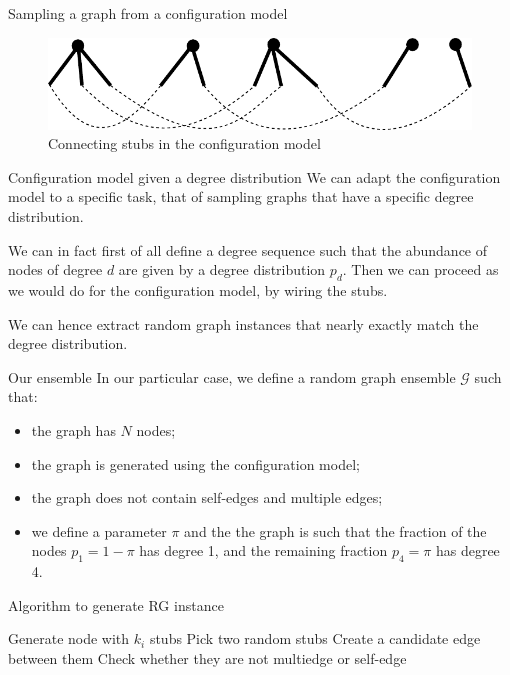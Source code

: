 \documentclass[handout]{beamer}
\begin{document}
\begin{frame}{Sampling a graph from a configuration model}
    \begin{figure}
        \centering
        \includegraphics[width=.4\textwidth]{config_model}
        \caption{Connecting stubs in the configuration model}
        \label{fig:config_model}
    \end{figure}
\end{frame}

\begin{frame}{Configuration model given a degree distribution}
    We can adapt the configuration model to a specific task, that of sampling
    graphs that have a specific \alert{degree distribution}.

    We can in fact first of all define a degree sequence such that the abundance
    of nodes of degree $d$ are given by a degree distribution $p_d$. Then we can
    proceed as we would do for the configuration model, by wiring the stubs.

    We can hence extract random graph instances that nearly exactly match the
    degree distribution.
\end{frame}

\begin{frame}{Our ensemble}
    In our particular case, we define a random graph ensemble $\mathcal{G}$ such
    that:
    \begin{itemize}
        \item the graph has $N$ nodes;
        \item the graph is generated using the configuration model;
        \item the graph \alert{does not} contain self-edges and multiple edges;
        \item we define a parameter $\pi$ and the the graph is such that the
            fraction of the nodes $p_1 = 1-\pi$ has degree 1, and the remaining
            fraction $p_4 = \pi$ has degree 4.
    \end{itemize}
\end{frame}

\begin{frame}{Algorithm to generate RG instance}
    \begin{algorithm}[H]
        \begin{algorithmic}[1]
                \STATE Generate node with $k_i$ stubs
            \ENDFOR
                    \STATE Pick two random stubs
                    \STATE Create a candidate edge between them
                    \STATE Check whether they are not multiedge or self-edge
                \ENDWHILE
            \ENDWHILE
        \end{algorithmic}
        \caption{Algorithm to generate stubs and connect them}
    \end{algorithm}
\end{frame}
\end{document}
